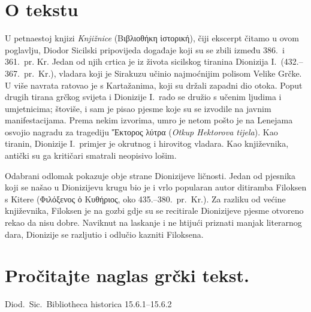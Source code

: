 


\section*{O tekstu}

U petnaestoj knjizi \textit{Knjižnice} \textgreek[variant=ancient]{(Βιβλιοθήκη ἱστορική),} čiji ekscerpt čitamo u ovom poglavlju, Diodor Sicilski pripovijeda događaje koji su se zbili između 386.\ i 361.\ pr. Kr. Jedan od njih crtica je iz života sicilskog tiranina Dionizija I.\ (432.–367.\ pr.~Kr.), vladara koji je Sirakuzu učinio najmoćnijim polisom Velike Grčke. U više navrata ratovao je s Kartažanima, koji su držali zapadni dio otoka. Poput drugih tirana grčkog svijeta i Dionizije I.\ rado se družio s učenim ljudima i umjetnicima; štoviše, i sam je pisao pjesme koje su se izvodile na javnim manifestacijama. Prema nekim izvorima, umro je netom pošto je na Lenejama osvojio nagradu za tragediju \textgreek[variant=ancient]{Ἕκτορος λύτρα} (\textit{Otkup Hektorova tijela}). Kao tiranin, Dionizije I.\ primjer je okrutnog i hirovitog vladara. Kao književnika, antički su ga kritičari smatrali neopisivo lošim.
 
Odabrani odlomak pokazuje obje strane Dionizijeve ličnosti. Jedan od pjesnika koji se našao u Dionizijevu krugu bio je i vrlo popularan autor ditiramba Filoksen s Kitere (\textgreek[variant=ancient]{Φιλόξενος ὁ Κυθήριος,} oko 435.–380.\ pr.~Kr.). Za razliku od većine književnika, Filoksen je na gozbi gdje su se recitirale Dionizijeve pjesme otvoreno rekao da nisu dobre. Naviknut na laskanje i ne htijući priznati manjak literarnog dara, Dionizije se razljutio i odlučio kazniti Filoksena.

\newpage

\section*{Pročitajte naglas grčki tekst.}

Diod.~Sic.\ Bibliotheca historica 15.6.1–15.6.2


\medskip


